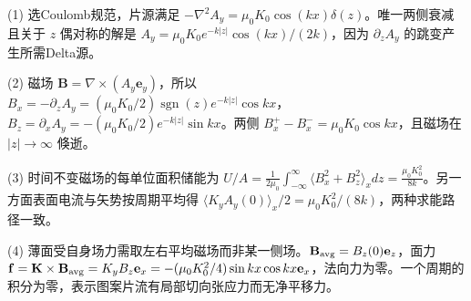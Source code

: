 (1) 选Coulomb规范，片源满足 \(-\nabla^2A_y=\mu_0K_0\cos(kx)\delta(z)\)。唯一两侧衰减且关于 \(z\) 偶对称的解是 \(\boxed{A_y=\mu_0K_0e^{-k|z|}\cos(kx)/(2k)}\)，因为 \(\partial_z A_y\) 的跳变产生所需Delta源。

(2) 磁场 \(\mathbf B=\nabla\times(A_y\mathbf e_y)\)，所以 \(B_x=-\partial_zA_y=(\mu_0K_0/2)\operatorname{sgn}(z)e^{-k|z|}\cos kx\)，\(B_z=\partial_xA_y=-(\mu_0K_0/2)e^{-k|z|}\sin kx\)。两侧 \(B_x^+-B_x^-=\mu_0K_0\cos kx\)，且磁场在 \(|z|\to\infty\) 倏逝。

(3) 时间不变磁场的每单位面积储能为 \(U/A=\frac1{2\mu_0}\int_{-\infty}^\infty\langle B_x^2+B_z^2\rangle_x dz=\frac{\mu_0K_0^2}{8k}\)。另一方面表面电流与矢势按周期平均得 \(\langle K_yA_y(0)\rangle_x/2=\mu_0K_0^2/(8k)\)，两种求能路径一致。

(4) 薄面受自身场力需取左右平均磁场而非某一侧场。\(\mathbf B_{\rm avg}=B_z(0)\mathbf e_z\)，面力 \(\mathbf f=\mathbf K\times\mathbf B_{\rm avg}=K_yB_z\mathbf e_x=-(\mu_0K_0^2/4)\sin kx\cos kx\mathbf e_x\)，法向力为零。一个周期的积分为零，表示图案片流有局部切向张应力而无净平移力。
